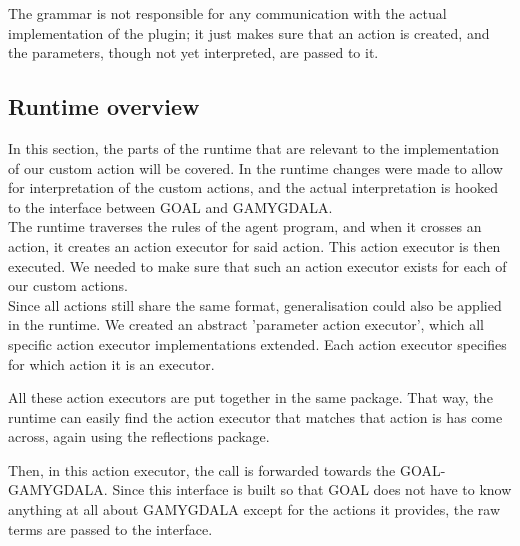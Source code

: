 The grammar is not responsible for any communication with the actual implementation of the plugin; it just makes sure that an action is created, and the parameters, though not yet interpreted, are passed to it.

\subsection{Runtime overview}
In this section, the parts of the runtime that are relevant to the implementation of our custom action will be covered. In the runtime changes were made to allow for interpretation of the custom actions, and the actual interpretation is hooked to the interface between GOAL and GAMYGDALA. \\ 

The runtime traverses the rules of the agent program, and when it crosses an action, it creates an action executor for said action. This action executor is then executed. We needed to make sure that such an action executor exists for each of our custom actions. \\

Since all actions still share the same format, generalisation could also be applied  in the runtime. We created an abstract 'parameter action executor', which all specific action executor implementations extended. Each action executor specifies for which action it is an executor.

All these action executors are put together in the same package. That way, the runtime can easily find the action executor that matches that action is has come across, again using the reflections package.

Then, in this action executor, the call is forwarded towards the GOAL-GAMYGDALA. Since this interface is built so that GOAL does not have to know anything at all about GAMYGDALA except for the actions it provides, the raw terms are passed to the interface.